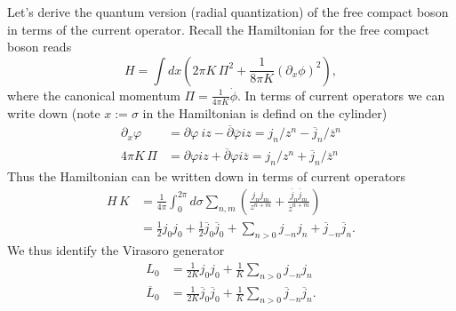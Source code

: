 Let's derive the quantum version (radial quantization) of the free compact boson in terms of the current operator. Recall the Hamiltonian for the free compact boson reads
\begin{equation}
	H = \int dx \left( 2\pi K\, \Pi^2 + \frac{1}{8\pi K} {\left(\partial_x \phi\right)}^2 \right),
\end{equation}
where the canonical momentum $\Pi = \frac{1}{4\pi K} \dot{\phi}$. In terms of current operators we can write down (note $x := \sigma$ in the Hamiltonian is defind on the cylinder)
\begin{equation}
	\begin{aligned}
		\partial_x \varphi &= \partial \varphi\ i z - \overline{\partial}\overline{\varphi} i z = j_n/z^n -\overline{j}_n / \overline{z}^n \\
		4\pi K\, \Pi &= \partial \varphi i z + \overline{\partial} \varphi i \overline{z} = j_n/z^n + \overline{j}_n / \overline{z}^n
	\end{aligned}
\end{equation}
Thus the Hamiltonian can be written down in terms of current operators
\begin{equation}
	\begin{aligned}
		H\,K &= \frac{1}{4\pi} \int_0^{2\pi} d\sigma \sum_{n,m} \left( \frac{j_n j_m}{z^{n+m}} + \frac{\overline{j}_n \overline{j}_m}{{\overline{z}}^{n+m}} \right) \\
		&= \frac{1}{2} j_0 j_0 + \frac{1}{2} \overline{j}_{0} \overline{j}_0 + \sum_{n>0} j_{-n} j_n + \overline{j}_{-n} \overline{j}_n.
	\end{aligned}
\end{equation}
We thus identify the Virasoro generator
\begin{equation}
	\begin{aligned}
		L_0 &= \frac{1}{2K} j_0 j_0 + \frac{1}{K}\sum_{n>0} j_{-n} j_n \\
		\overline{L}_0 &= \frac{1}{2K} \overline{j}_{0} \overline{j}_0 + \frac{1}{K}\sum_{n>0} \overline{j}_{-n} \overline{j}_n.
	\end{aligned}
\end{equation}

